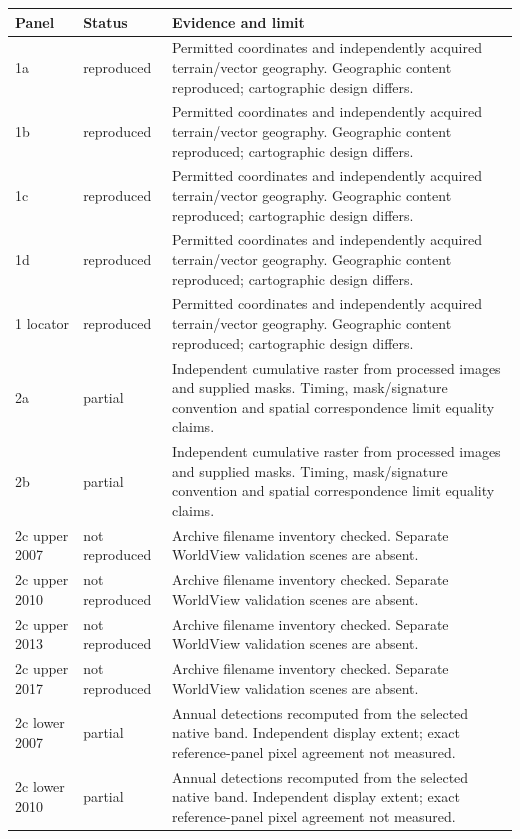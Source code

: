 \small\begin{longtable}{p{.12\linewidth}p{.16\linewidth}p{.64\linewidth}}
\toprule Panel & Status & Evidence and limit\\\midrule\endhead
1a & reproduced & Permitted coordinates and independently acquired terrain/vector geography. Geographic content reproduced; cartographic design differs.\\
1b & reproduced & Permitted coordinates and independently acquired terrain/vector geography. Geographic content reproduced; cartographic design differs.\\
1c & reproduced & Permitted coordinates and independently acquired terrain/vector geography. Geographic content reproduced; cartographic design differs.\\
1d & reproduced & Permitted coordinates and independently acquired terrain/vector geography. Geographic content reproduced; cartographic design differs.\\
1 locator & reproduced & Permitted coordinates and independently acquired terrain/vector geography. Geographic content reproduced; cartographic design differs.\\
2a & partial & Independent cumulative raster from processed images and supplied masks. Timing, mask/signature convention and spatial correspondence limit equality claims.\\
2b & partial & Independent cumulative raster from processed images and supplied masks. Timing, mask/signature convention and spatial correspondence limit equality claims.\\
2c upper 2007 & not reproduced & Archive filename inventory checked. Separate WorldView validation scenes are absent.\\
2c upper 2010 & not reproduced & Archive filename inventory checked. Separate WorldView validation scenes are absent.\\
2c upper 2013 & not reproduced & Archive filename inventory checked. Separate WorldView validation scenes are absent.\\
2c upper 2017 & not reproduced & Archive filename inventory checked. Separate WorldView validation scenes are absent.\\
2c lower 2007 & partial & Annual detections recomputed from the selected native band. Independent display extent; exact reference-panel pixel agreement not measured.\\
2c lower 2010 & partial & Annual detections recomputed from the selected native band. Independent display extent; exact reference-panel pixel agreement not measured.\\

\end{longtable}
